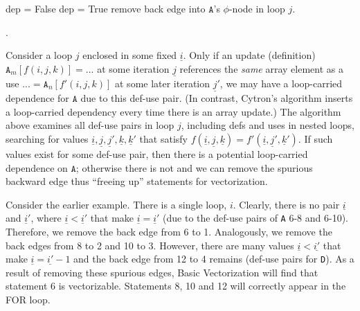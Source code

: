 \documentclass[sigconf, screen, natbib=false, dvipsnames, table]{acmart}
\theoremstyle{definition}
\begin{document}
\begin{algorithmic}
\STATE {}
\STATE dep = False
\STATE dep = True
\ENDIF
\ENDFOR
{}
\STATE remove back edge into $\texttt{A}$'s $\phi$-node in loop $j$.
\ENDIF
\ENDFOR
\end{algorithmic}

.

Consider a loop $j$ enclosed in some fixed $\underline{i}$. Only if an update (definition) $\texttt{A}_m[f(i,j,k)] = ... $ at some iteration $\underline{j}$
references the \emph{same} array element as a use $ ... = \texttt{A}_n[f'(i,j,k)]$ at some later iteration $\underline{j}'$,
we may have a loop-carried dependence for $\texttt{A}$ due to this def-use pair. (In contrast, Cytron's algorithm inserts a loop-carried dependency every time there is an array update.)
The algorithm above examines all def-use pairs in loop $j$, including defs and uses in nested loops, searching for values $\underline{i}, \underline{j}, \underline{j}', \underline{k}, \underline{k}'$ that satisfy
$f(\underline{i},\underline{j},\underline{k}) = f'(\underline{i},\underline{j}',\underline{k}')$. If such values exist for some def-use pair, then there is a potential
loop-carried dependence on $\texttt{A}$; otherwise there is not and we can remove the spurious backward edge thus ``freeing up'' statements for vectorization. %

Consider the earlier example. There is a single loop, $i$. Clearly, there is no pair $\underline{i}$ and $\underline{i}'$, where $\underline{i} < \underline{i}'$ that make $\underline{i} = \underline{i}'$ (due to the def-use pairs of \texttt{A} 6-8 and 6-10).
Therefore, we remove the back edge from 6 to 1. Analogously, we remove the back edges from 8 to 2 and 10 to 3. However, there are many values $\underline{i} < \underline{i'}$ that make $\underline{i} = \underline{i'}-1$ and the back edge from 12 to 4 remains (def-use pairs for \texttt{D}). As a result of removing these spurious edges, Basic Vectorization will find that statement 6 is vectorizable. Statements 8, 10 and 12 will correctly appear in the FOR loop.
\end{document}
